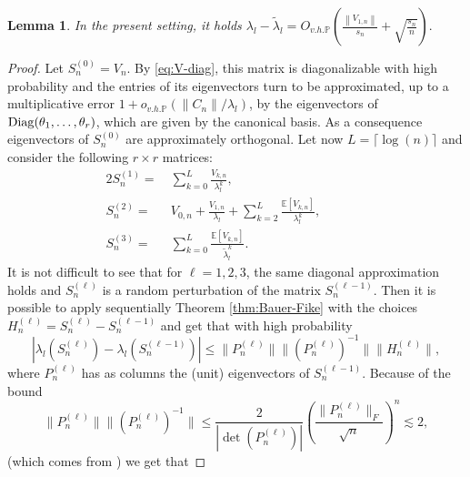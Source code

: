 \documentclass[11pt,oneside]{amsart}
\theoremstyle{plain}
\newtheorem{lemma}[theorem]{Lemma}
\numberwithin{equation}{section}
\newcommand{\E}{\mathbb{E}}
\newcommand{\p}{\mathbb{P}}
\newcommand{\centered}{C_n}
\newcommand{\deterministic}{S_n}
\newcommand{\scaling}{s_n}
\newcommand{\ohp}{o_{v.h.\p}}
\newcommand{\Ohp}{O_{v.h.\p}}
\begin{document}
\begin{lemma} \label{lem:tilde-m}
       In the present setting, it holds
        $\lambda_l-\tilde\lambda_l=\Ohp\left(\frac{\left\|V_{1,n}\right\|}{\scaling}+\sqrt{\frac{\scaling}{n}}\right).$
\end{lemma}
\begin{proof}
    Let $\deterministic^{(0)}=V_n$. By \eqref{eq:V-diag}, this matrix is diagonalizable with high probability and the entries of its eigenvectors turn to be approximated, up to a multiplicative error $1+\ohp  \left({\|\centered\|}/{\lambda_l}\right)$, by the eigenvectors of  $ {\rm Diag}(\theta_1,\dots,\theta_r)$, which are given by the canonical basis. As a consequence eigenvectors of $\deterministic^{(0)}$ are approximately orthogonal.
    Let now $L=\lceil\log(n)\rceil$ and consider the following $r \times r$ matrices:
     \begin{alignat}{2}
    \deterministic^{(1)}=& \ \sum_{k=0}^L\frac{V_{k,n}}{\lambda_l^k}, \qquad  &&    
    \\
    \deterministic^{(2)}=& \ V_{0,n}+\frac{V_{1,n}}{\lambda_l}+\sum_{k=2}^L\frac{\E[V_{k,n}]}{\lambda_l^k}, \qquad &&
    \\
    \deterministic^{(3)}=& \ \sum_{k=0}^L\frac{\E[V_{k,n}]}{\tilde \lambda_l^k}     
    . \qquad && %
\end{alignat}
It is not difficult to see that for $\ell=1,2,3$, the same diagonal approximation holds and $\deterministic^{(\ell)}$ is a random perturbation of the matrix $\deterministic^{(\ell-1)}$.
Then it is possible to apply sequentially Theorem \ref{thm:Bauer-Fike} with the choices $H^{(\ell)}_n=\deterministic^{(\ell)}-\deterministic^{(\ell-1)}$ and get that with high probability 
\begin{equation}
    |\lambda_l(\deterministic^{(\ell)})-\lambda_l(\deterministic^{(\ell-1)})|\le \|P^{(\ell)}_n\|\|(P^{(\ell)}_n)^{-1}\|\|H^{(\ell)}_n\|,
\end{equation}
where $P^{(\ell)}_n$ has as columns the (unit) eigenvectors of $\deterministic^{(\ell-1)}$. Because of the bound
$$\|P^{(\ell)}_n\|\|(P^{(\ell)}_n)^{-1}\|\le \frac{2}{|\det(P^{(\ell)}_n)|}\left(\frac{\|P^{(\ell)}_n\|_F}{\sqrt n}\right)^n \lesssim 2,$$ (which comes from \cite{GEJ}) we get that 

\end{proof}
\end{document}
